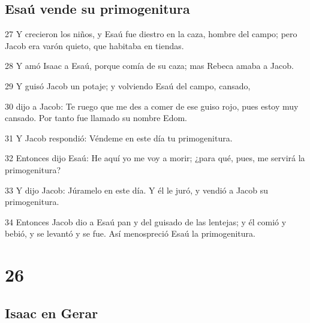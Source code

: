 \section*{Esaú vende su primogenitura}

\par 27 Y crecieron los niños, y Esaú fue diestro en la caza, hombre del campo; pero Jacob era varón quieto, que habitaba en tiendas.
\par 28 Y amó Isaac a Esaú, porque comía de su caza; mas Rebeca amaba a Jacob.
\par 29 Y guisó Jacob un potaje; y volviendo Esaú del campo, cansado,
\par 30 dijo a Jacob: Te ruego que me des a comer de ese guiso rojo, pues estoy muy cansado. Por tanto fue llamado su nombre Edom.
\par 31 Y Jacob respondió: Véndeme en este día tu primogenitura.
\par 32 Entonces dijo Esaú: He aquí yo me voy a morir; ¿para qué, pues, me servirá la primogenitura?
\par 33 Y dijo Jacob: Júramelo en este día. Y él le juró, y vendió a Jacob su primogenitura.
\par 34 Entonces Jacob dio a Esaú pan y del guisado de las lentejas; y él comió y bebió, y se levantó y se fue. Así menospreció Esaú la primogenitura.

\chapter{26}

\section*{Isaac en Gerar}

